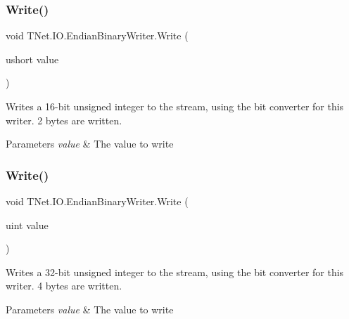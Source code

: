 \subsubsection{\texorpdfstring{Write()}{Write()}\hspace{0.1cm}{\footnotesize\ttfamily [5/17]}}
{\footnotesize\ttfamily void T\+Net.\+I\+O.\+Endian\+Binary\+Writer.\+Write (\begin{DoxyParamCaption}\item[{ushort}]{value }\end{DoxyParamCaption})}



Writes a 16-\/bit unsigned integer to the stream, using the bit converter for this writer. 2 bytes are written. 


\begin{DoxyParams}{Parameters}
{\em value} & The value to write\\
\hline
\end{DoxyParams}
\mbox{\label{class_t_net_1_1_i_o_1_1_endian_binary_writer_a4cccab9063a2a0f199248ccd34aeb6df}} 
\subsubsection{\texorpdfstring{Write()}{Write()}\hspace{0.1cm}{\footnotesize\ttfamily [6/17]}}
{\footnotesize\ttfamily void T\+Net.\+I\+O.\+Endian\+Binary\+Writer.\+Write (\begin{DoxyParamCaption}\item[{uint}]{value }\end{DoxyParamCaption})}



Writes a 32-\/bit unsigned integer to the stream, using the bit converter for this writer. 4 bytes are written. 


\begin{DoxyParams}{Parameters}
{\em value} & The value to write\\
\hline
\end{DoxyParams}
\mbox{\label{class_t_net_1_1_i_o_1_1_endian_binary_writer_af263971a67afaaac4aa920fe9cbace06}} 
